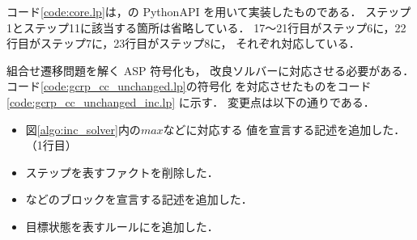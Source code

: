 コード\ref{code:core.lp}は，\clingo の PythonAPI を用いて実装したものである．
ステップ1とステップ11に該当する箇所は省略している．
17～21行目がステップ6に，22行目がステップ7に，23行目がステップ8に，
それぞれ対応している．




組合せ遷移問題を解く ASP 符号化も，
改良ソルバーに対応させる必要がある．
コード\ref{code:gcrp_cc_unchanged.lp}の符号化
を対応させたものをコード\ref{code:gcrp_cc_unchanged_inc.lp}
に示す．
変更点は以下の通りである．
\begin{itemize}
  \item 図\ref{algo:inc_solver}内の$max$などに対応する
  値を宣言する記述を追加した．（1行目）
  \item ステップを表すファクトを削除した．
  \item {}などのブロックを宣言する記述を追加した．
  \item 目標状態を表すルールにを追加した．
\end{itemize}

